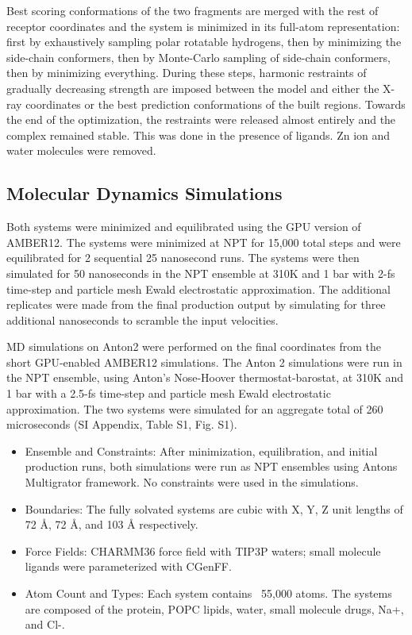 \documentclass[9pt,twoside]{pnas-new}
\begin{document}
Best scoring conformations of the two fragments are merged with the rest of receptor coordinates and the system is minimized in its full-atom representation: first by exhaustively sampling polar rotatable hydrogens, then by minimizing the side-chain conformers, then by Monte-Carlo sampling of side-chain conformers, then by minimizing everything. During these steps, harmonic restraints of gradually decreasing strength are imposed between the model and either the X-ray coordinates or the best prediction conformations of the built regions. Towards the end of the optimization, the restraints were released almost entirely and the complex remained stable. This was done in the presence of ligands. Zn ion and water molecules were removed.

\subsection*{Molecular Dynamics Simulations} Both systems were minimized and equilibrated using the GPU version of AMBER12. The systems were minimized at NPT for 15,000 total steps and were equilibrated for 2 sequential 25 nanosecond runs. The systems were then simulated for 50 nanoseconds in the NPT ensemble at 310K and 1 bar with 2-fs time-step and particle mesh Ewald electrostatic approximation. The additional replicates were made from the final production output by simulating for three additional nanoseconds to scramble the input velocities.

MD simulations on Anton2 were performed on the final coordinates from the short GPU-enabled AMBER12 simulations. The Anton 2 simulations were run in the NPT ensemble, using Anton's Nose-Hoover thermostat-barostat, at 310K and 1 bar with a 2.5-fs time-step and particle mesh Ewald electrostatic approximation. The two systems were simulated for an aggregate total of 260 microseconds (SI Appendix, Table S1, Fig. S1). 

\begin{itemize}
  \item Ensemble and Constraints: After minimization, equilibration, and initial production runs, both simulations were run as NPT ensembles using Anton\textquotesingle s Multigrator framework. No constraints were used in the simulations.
  \item Boundaries: The fully solvated systems are cubic with X, Y, Z unit lengths of 72 \si{\angstrom}, 72 \si{\angstrom}, and 103 \si{\angstrom} respectively.
  \item Force Fields: CHARMM36 force field with TIP3P waters; small molecule ligands were parameterized with CGenFF.
  \item Atom Count and Types: Each system contains ~55,000 atoms. The systems are composed of the protein, POPC lipids, water, small molecule drugs, Na+, and Cl-.
\end{itemize}
\end{document}
